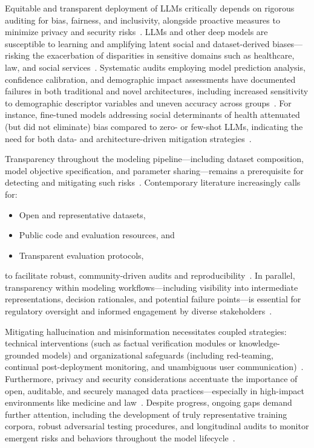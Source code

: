 \documentclass[sigconf]{acmart}
\begin{document}
Equitable and transparent deployment of LLMs critically depends on rigorous auditing for bias, fairness, and inclusivity, alongside proactive measures to minimize privacy and security risks~\cite{ref1, ref2, ref3, ref10, ref14, ref21, ref22, ref23, ref36, ref42, ref43, ref44, ref46, ref49, ref52, ref53, ref65, ref73}. LLMs and other deep models are susceptible to learning and amplifying latent social and dataset-derived biases—risking the exacerbation of disparities in sensitive domains such as healthcare, law, and social services~\cite{ref3, ref10, ref21, ref22, ref23, ref42, ref43, ref44, ref49, ref52, ref53, ref65}. Systematic audits employing model prediction analysis, confidence calibration, and demographic impact assessments have documented failures in both traditional and novel architectures, including increased sensitivity to demographic descriptor variables and uneven accuracy across groups~\cite{ref22, ref44, ref49, ref53}. For instance, fine-tuned models addressing social determinants of health attenuated (but did not eliminate) bias compared to zero- or few-shot LLMs, indicating the need for both data- and architecture-driven mitigation strategies~\cite{ref22, ref23}.

Transparency throughout the modeling pipeline—including dataset composition, model objective specification, and parameter sharing—remains a prerequisite for detecting and mitigating such risks~\cite{ref14, ref36, ref46, ref65, ref73}. Contemporary literature increasingly calls for: 
\begin{itemize}
    \item Open and representative datasets,
    \item Public code and evaluation resources, and
    \item Transparent evaluation protocols,
\end{itemize}
to facilitate robust, community-driven audits and reproducibility~\cite{ref1, ref36, ref44, ref49, ref65, ref73}. In parallel, transparency within modeling workflows—including visibility into intermediate representations, decision rationales, and potential failure points—is essential for regulatory oversight and informed engagement by diverse stakeholders~\cite{ref14, ref45, ref46, ref49, ref52, ref65}.

Mitigating hallucination and misinformation necessitates coupled strategies: technical interventions (such as factual verification modules or knowledge-grounded models) and organizational safeguards (including red-teaming, continual post-deployment monitoring, and unambiguous user communication)~\cite{ref3, ref10, ref21, ref42, ref43, ref65}. Furthermore, privacy and security considerations accentuate the importance of open, auditable, and securely managed data practices—especially in high-impact environments like medicine and law~\cite{ref14, ref36, ref42, ref46, ref53, ref65}. Despite progress, ongoing gaps demand further attention, including the development of truly representative training corpora, robust adversarial testing procedures, and longitudinal audits to monitor emergent risks and behaviors throughout the model lifecycle~\cite{ref21, ref23, ref42, ref65, ref73}.
\end{document}
